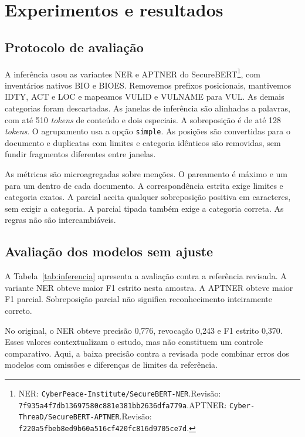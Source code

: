 \section{Experimentos e resultados}
\label{sec:exp}

\subsection{Protocolo de avaliação}

A inferência usou as variantes NER e APTNER do SecureBERT\footnote{NER: \texttt{CyberPeace-Institute/SecureBERT-NER}.\newline Revisão: \texttt{7f935a4f7db13697580c881e381bb2636dfa779a}.\newline APTNER: \texttt{Cyber-ThreaD/SecureBERT-APTNER}.\newline Revisão: \texttt{f220a5fbeb8ed9b60a516cf420fc816d9705ce7d}.}, com inventários nativos BIO e BIOES. Removemos prefixos posicionais, mantivemos IDTY, ACT e LOC e mapeamos VULID e VULNAME para VUL. As demais categorias foram descartadas. As janelas de inferência são alinhadas a palavras, com até 510 \textit{tokens} de conteúdo e dois especiais. A sobreposição é de até 128 \textit{tokens}. O agrupamento usa a opção \texttt{simple}. As posições são convertidas para o documento e duplicatas com limites e categoria idênticos são removidas, sem fundir fragmentos diferentes entre janelas.

As métricas são microagregadas sobre menções. O pareamento é máximo e um para um dentro de cada documento. A correspondência estrita exige limites e categoria exatos. A parcial aceita qualquer sobreposição positiva em caracteres, sem exigir a categoria. A parcial tipada também exige a categoria correta. As regras não são intercambiáveis.

\subsection{Avaliação dos modelos sem ajuste}

A Tabela~\ref{tab:inferencia} apresenta a avaliação contra a referência revisada. A variante NER obteve maior F1 estrito nesta amostra. A APTNER obteve maior F1 parcial. Sobreposição parcial não significa reconhecimento inteiramente correto.



No original, o NER obteve precisão 0,776, revocação 0,243 e F1 estrito 0,370. Esses valores contextualizam o estudo, mas não constituem um controle comparativo. Aqui, a baixa precisão contra a revisada pode combinar erros dos modelos com omissões e diferenças de limites da referência.

